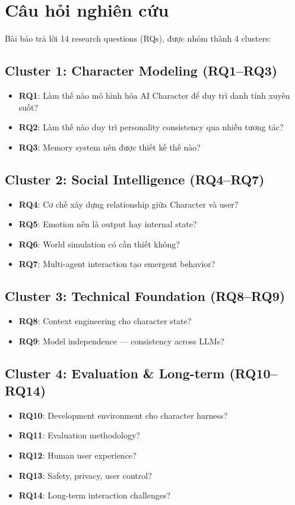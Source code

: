 \section{Câu hỏi nghiên cứu}

Bài báo trả lời 14 research questions (RQs), được nhóm thành 4 clusters:

\subsection{Cluster 1: Character Modeling (RQ1--RQ3)}
\begin{itemize}
    \item \textbf{RQ1}: Làm thế nào mô hình hóa AI Character để duy trì danh tính xuyên suốt?
    \item \textbf{RQ2}: Làm thế nào duy trì personality consistency qua nhiều tương tác?
    \item \textbf{RQ3}: Memory system nên được thiết kế thế nào?
\end{itemize}

\subsection{Cluster 2: Social Intelligence (RQ4--RQ7)}
\begin{itemize}
    \item \textbf{RQ4}: Cơ chế xây dựng relationship giữa Character và user?
    \item \textbf{RQ5}: Emotion nên là output hay internal state?
    \item \textbf{RQ6}: World simulation có cần thiết không?
    \item \textbf{RQ7}: Multi-agent interaction tạo emergent behavior?
\end{itemize}

\subsection{Cluster 3: Technical Foundation (RQ8--RQ9)}
\begin{itemize}
    \item \textbf{RQ8}: Context engineering cho character state?
    \item \textbf{RQ9}: Model independence --- consistency across LLMs?
\end{itemize}

\subsection{Cluster 4: Evaluation \& Long-term (RQ10--RQ14)}
\begin{itemize}
    \item \textbf{RQ10}: Development environment cho character harness?
    \item \textbf{RQ11}: Evaluation methodology?
    \item \textbf{RQ12}: Human user experience?
    \item \textbf{RQ13}: Safety, privacy, user control?
    \item \textbf{RQ14}: Long-term interaction challenges?
\end{itemize}

